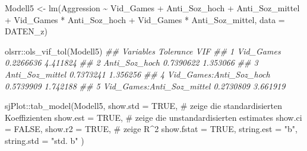\documentclass[
  10pt,
  letterpaper,
  a4paper, twoside]{scrreprt}
\newenvironment{Shaded}{\begin{snugshade}}{\end{snugshade}}
\newcommand{\AttributeTok}[1]{\textcolor[rgb]{0.40,0.45,0.13}{#1}}
\newcommand{\CommentTok}[1]{\textcolor[rgb]{0.37,0.37,0.37}{#1}}
\newcommand{\ConstantTok}[1]{\textcolor[rgb]{0.56,0.35,0.01}{#1}}
\newcommand{\DocumentationTok}[1]{\textcolor[rgb]{0.37,0.37,0.37}{\textit{#1}}}
\newcommand{\FunctionTok}[1]{\textcolor[rgb]{0.28,0.35,0.67}{#1}}
\newcommand{\NormalTok}[1]{\textcolor[rgb]{0.00,0.23,0.31}{#1}}
\newcommand{\OtherTok}[1]{\textcolor[rgb]{0.00,0.23,0.31}{#1}}
\newcommand{\SpecialCharTok}[1]{\textcolor[rgb]{0.37,0.37,0.37}{#1}}
\newcommand{\StringTok}[1]{\textcolor[rgb]{0.13,0.47,0.30}{#1}}
\begin{document}
\begin{Shaded}
\begin{Highlighting}[]
\NormalTok{Modell5 }\OtherTok{\textless{}{-}} \FunctionTok{lm}\NormalTok{(Aggression }\SpecialCharTok{\textasciitilde{}}\NormalTok{ Vid\_Games }\SpecialCharTok{+}\NormalTok{ Anti\_Soz\_hoch }\SpecialCharTok{+}\NormalTok{ Anti\_Soz\_mittel }\SpecialCharTok{+}
\NormalTok{                Vid\_Games }\SpecialCharTok{*}\NormalTok{ Anti\_Soz\_hoch }\SpecialCharTok{+}\NormalTok{ Vid\_Games }\SpecialCharTok{*}\NormalTok{ Anti\_Soz\_mittel,}
              \AttributeTok{data =}\NormalTok{ DATEN\_z)}

\NormalTok{olsrr}\SpecialCharTok{::}\FunctionTok{ols\_vif\_tol}\NormalTok{(Modell5)}
\DocumentationTok{\#\#                   Variables Tolerance      VIF}
\DocumentationTok{\#\# 1                 Vid\_Games 0.2266636 4.411824}
\DocumentationTok{\#\# 2             Anti\_Soz\_hoch 0.7390622 1.353066}
\DocumentationTok{\#\# 3           Anti\_Soz\_mittel 0.7373241 1.356256}
\DocumentationTok{\#\# 4   Vid\_Games:Anti\_Soz\_hoch 0.5739909 1.742188}
\DocumentationTok{\#\# 5 Vid\_Games:Anti\_Soz\_mittel 0.2730809 3.661919}

\NormalTok{sjPlot}\SpecialCharTok{::}\FunctionTok{tab\_model}\NormalTok{(Modell5, }
                  \AttributeTok{show.std =} \ConstantTok{TRUE}\NormalTok{, }\CommentTok{\# zeige die standardisierten Koeffizienten}
                  \AttributeTok{show.est =} \ConstantTok{TRUE}\NormalTok{, }\CommentTok{\# zeige die unstandardisierten estimates}
                  \AttributeTok{show.ci =} \ConstantTok{FALSE}\NormalTok{,}
                  \AttributeTok{show.r2 =} \ConstantTok{TRUE}\NormalTok{, }\CommentTok{\# zeige R\^{}2}
                  \AttributeTok{show.fstat =} \ConstantTok{TRUE}\NormalTok{,}
                  \AttributeTok{string.est =} \StringTok{"b"}\NormalTok{,}
                  \AttributeTok{string.std =} \StringTok{"std. b"}
\NormalTok{                  )}
\end{Highlighting}
\end{Shaded}
\end{document}
